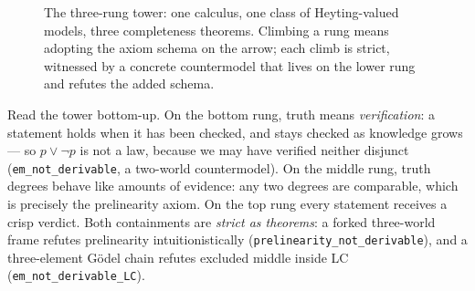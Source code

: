 \documentclass[11pt]{article}
\newcommand{\code}[1]{\texttt{#1}}
\theoremstyle{plain}
\theoremstyle{definition}
\begin{document}
\begin{figure}[t]
\centering
{}
\caption{The three-rung tower: one calculus, one class of Heyting-valued
models, three completeness theorems.  Climbing a rung means adopting the
axiom schema on the arrow; each climb is strict, witnessed by a concrete
countermodel that lives on the lower rung and refutes the added schema.}
\label{fig:tower}
\end{figure}

Read the tower bottom-up.  On the bottom rung, truth means
\emph{verification}: a statement holds when it has been checked, and stays
checked as knowledge grows --- so $p\vee\neg p$ is not a law, because we may
have verified neither disjunct (\code{em\_not\_derivable}, a two-world
countermodel).  On the middle rung, truth degrees behave like amounts of
evidence: any two degrees are comparable, which is precisely the prelinearity
axiom.  On the top rung every statement receives a crisp verdict.  Both
containments are \emph{strict as theorems}: a forked three-world frame
refutes prelinearity intuitionistically
(\code{prelinearity\_not\_derivable}), and a three-element G\"odel chain
refutes excluded middle inside LC (\code{em\_not\_derivable\_LC}).
\end{document}
